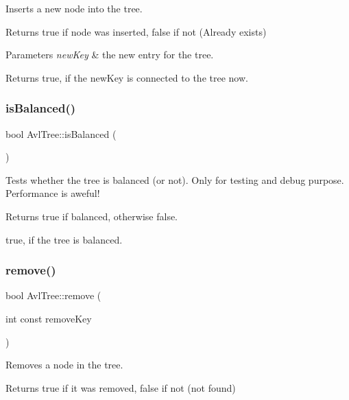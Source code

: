 Inserts a new node into the tree. \begin{DoxyReturn}{Returns}
true if node was inserted, false if not (Already exists)
\end{DoxyReturn}

\begin{DoxyParams}{Parameters}
{\em new\+Key} & the new entry for the tree. \\
\hline
\end{DoxyParams}
\begin{DoxyReturn}{Returns}
true, if the new\+Key is connected to the tree now. 
\end{DoxyReturn}
\mbox{\label{class_avl_tree_af8f43d1139179e490fffbdd03f7735ac}} 
\subsubsection{\texorpdfstring{is\+Balanced()}{isBalanced()}}
{\footnotesize\ttfamily bool Avl\+Tree\+::is\+Balanced (\begin{DoxyParamCaption}{ }\end{DoxyParamCaption})}

Tests whether the tree is balanced (or not). Only for testing and debug purpose. Performance is aweful! \begin{DoxyReturn}{Returns}
true if balanced, otherwise false.

true, if the tree is balanced. 
\end{DoxyReturn}
\mbox{\label{class_avl_tree_a9f580161de922fdd2ddb826cc8d8436f}} 
\subsubsection{\texorpdfstring{remove()}{remove()}}
{\footnotesize\ttfamily bool Avl\+Tree\+::remove (\begin{DoxyParamCaption}\item[{int const}]{remove\+Key }\end{DoxyParamCaption})}

Removes a node in the tree. \begin{DoxyReturn}{Returns}
true if it was removed, false if not (not found)
\end{DoxyReturn}

